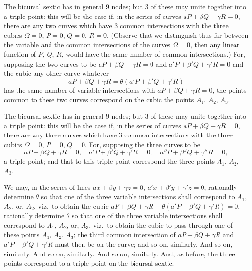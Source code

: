 \documentclass[11pt,a4paper]{article}
\theoremstyle{plain}
\theoremstyle{definition}
\theoremstyle{remark}
\begin{document}
The bicursal sextic has in general $9$ nodes; but $3$ of these may unite together into a triple point: this will be the case if, in the series of curves $aP + \beta Q + \gamma R = 0$, there are any two curves which have $3$ common intersections with the three cubics $\Omega = 0$, $P = 0$, $Q = 0$, $R = 0$. (Observe that we distinguish thus far between the variable and the common intersections of the curves $\Omega = 0$, then any linear function of $P$, $Q$, $R$, would have the same number of common intersections.) For, supposing the two curves to be $aP + \beta Q + \gamma R = 0$ and $a'P + \beta'Q + \gamma'R = 0$ and the cubic any other curve whatever
\[
aP + \beta Q + \gamma R = \theta(a'P + \beta'Q + \gamma'R)
\]
has the same number of variable intersections with $aP + \beta Q + \gamma R = 0$, the points common to these two curves correspond on the cubic the points $A_1$, $A_2$, $A_3$.

The bicursal sextic has in general $9$ nodes; but $3$ of these may unite together into a triple point: this will be the case if, in the series of curves $aP + \beta Q + \gamma R = 0$, there are any three curves which have $3$ common intersections with the three cubics $\Omega = 0$, $P = 0$, $Q = 0$. For, supposing the three curves to be
\[
aP + \beta Q + \gamma R = 0, \quad a'P + \beta'Q + \gamma'R = 0, \quad a''P + \beta''Q + \gamma''R = 0,
\]
a triple point; and that to this triple point correspond the three points $A_1$, $A_2$, $A_3$.

We may, in the series of lines $ax + \beta y + \gamma z = 0$, $a'x + \beta'y + \gamma'z = 0$, rationally determine $\theta$ so that one of the three variable intersections shall correspond to $A_1$, $A_2$, or, $A_2$, viz.\ to obtain the cubic $aP + \beta Q + \gamma R - \theta(a'P + \beta'Q + \gamma'R) = 0$, rationally determine $\theta$ so that one of the three variable intersections shall correspond to $A_1$, $A_2$, or, $A_3$, viz.\ to obtain the cubic to pass through one of these points $A_1$, $A_2$, $A_3$; the third common intersection of $aP + \beta Q + \gamma R$ and $a'P + \beta'Q + \gamma'R$ must then be on the curve; and so on, similarly. And so on, similarly. And so on, similarly. And so on, similarly. And, as before, the three points correspond to a triple point on the bicursal sextic.

\bigskip
\end{document}
